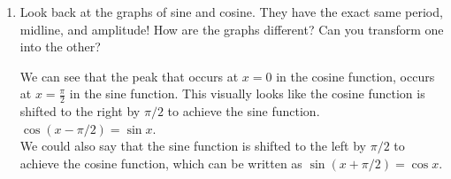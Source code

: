 \documentclass[main]{subfiles}
\begin{document}
\begin{enumerate}[resume]
\begin{multicols}{2}
  \end{multicols}
  \setlength{\columnsep}{10pt}

\begin{problem}
  Given the maximum and minimum values of a sinusoidal function, how can you determine the midline and amplitude of its graph?
\end{problem}
\pspace{\vfill}

  \begin{solution} The amplitude is the half of the vertical distance between the peaks and the troughs. Compute the vertical distance between one peak and one trough and divide this distance in half.\\
  The midline is the amplitude subtracted from the $y$-value of a peak or added to the $y$-value of a trough.
  \end{solution}
\item 
\begin{problem}
    Look back at the graphs of sine and cosine. They have the exact same period, midline, and amplitude! How are the graphs different? Can you transform one into the other?
\end{problem}

\pspace{\vfill}
\begin{solution}
    We can see that the peak that occurs at $x=0$ in the cosine function, occurs at $x=\frac{\pi}{2}$ in the sine function. This visually looks like the cosine function is shifted to the right by $\pi/2$ to achieve the sine function. 
    $\cos(x-\pi/2)=\sin x$. \\
    We could also say that the sine function is shifted to the left by $\pi/2$ to achieve the cosine function, which can be written as $\sin(x+\pi/2)=\cos x$.
\end{solution}

\end{enumerate}

\pspace{\newpage}
\end{document}
